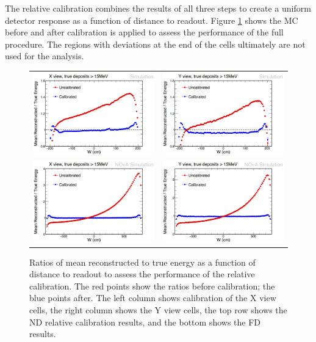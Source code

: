 The relative calibration combines the results of all three steps to create a uniform detector response as a function of distance to readout. Figure \ref{fig:CalibRelative} shows the MC before and after calibration is applied to assess the performance of the full procedure. The regions with deviations at the end of the cells ultimately are not used for the analysis.
\begin{figure}[p]
  \centering
  \begin{tabular}{c c}
    \includegraphics[width=.47\textwidth]{figures/Calib/RelativeNDX.png} &
    \includegraphics[width=.47\textwidth]{figures/Calib/RelativeNDY.png} \\
    \includegraphics[width=.47\textwidth]{figures/Calib/RelativeFDX.png} &
    \includegraphics[width=.47\textwidth]{figures/Calib/RelativeFDY.png} \\
  \end{tabular}
  \caption[Relative Calibration Results]{Ratios of mean reconstructed to true energy as a function of distance to readout to assess the performance of the relative calibration. The red points show the ratios before calibration; the blue points after. The left column shows calibration of the X view cells, the right column shows the Y view cells, the top row shows the ND relative calibration results, and the bottom shows the FD results.}
  \label{fig:CalibRelative}
\end{figure}

